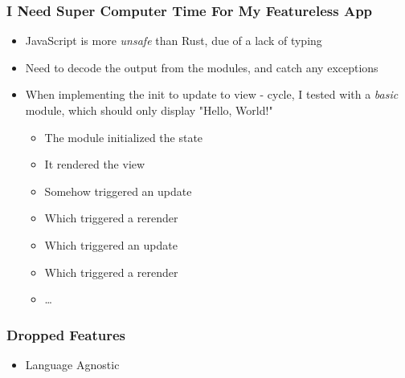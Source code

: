 \begin{frame}
  \frametitle{I Need Super Computer Time For My Featureless App}
  \begin{itemize}
    \pause
    \item JavaScript is more \textit{unsafe} than Rust, due of a lack of typing
    \pause
    \item Need to decode the output from the modules, and catch any exceptions
    \pause
    \item When implementing the init to update to view - cycle, I tested with
      a \textit{basic} module, which should only display "Hello, World!"
      \begin{itemize}
        \pause
        \item The module initialized the state
        \pause
        \item It rendered the view
        \pause
        \item Somehow triggered an update
        \pause
        \item Which triggered a rerender
        \pause
        \item Which triggered an update
        \pause
        \item Which triggered a rerender
        \pause
        \item \dots
      \end{itemize}
  \end{itemize}
\end{frame}

\begin{frame}
  \frametitle{Dropped Features}
  \begin{itemize}
    \item Language Agnostic
  \end{itemize}
\end{frame}
